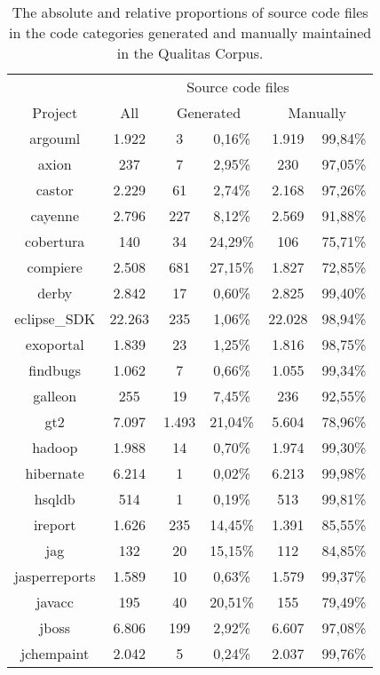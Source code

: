 \setlength{\extrarowheight}{-.17em}
\begin{table}
	\caption[Source code file distributions in the Qualitas Corpus.]{The absolute and relative proportions of source code files in the code categories generated and manually maintained in the Qualitas Corpus.}
	\label{table:countQualitasCorpus}
	\begin{tabularx}{\textwidth}{c|c|c|c|c|c}
		 & \multicolumn{5}{c}{Source code files}  \\
		Project & All & \multicolumn{2}{c|}{Generated} & \multicolumn{2}{c}{Manually}\\
		\hline
		argouml & 1.922 & 3 & 0,16\% & 1.919 & 99,84\% \\
		axion & 237 & 7 & 2,95\% & 230 & 97,05\% \\
		castor & 2.229 & 61 & 2,74\% & 2.168 & 97,26\% \\
		cayenne & 2.796 & 227 & 8,12\% & 2.569 & 91,88\% \\
		cobertura & 140 & 34 & 24,29\% & 106 & 75,71\% \\
		compiere & 2.508 & 681 & 27,15\% & 1.827 & 72,85\% \\
		derby & 2.842 & 17 & 0,60\% & 2.825 & 99,40\% \\
		eclipse\_SDK & 22.263 & 235 & 1,06\% & 22.028 & 98,94\% \\
		exoportal & 1.839 & 23 & 1,25\% & 1.816 & 98,75\% \\
		findbugs & 1.062 & 7 & 0,66\% & 1.055 & 99,34\% \\
		galleon & 255 & 19 & 7,45\% & 236 & 92,55\% \\
		gt2 & 7.097 & 1.493 & 21,04\% & 5.604 & 78,96\% \\
		hadoop & 1.988 & 14 & 0,70\% & 1.974 & 99,30\% \\
		hibernate & 6.214 & 1 & 0,02\% & 6.213 & 99,98\% \\
		hsqldb & 514 & 1 & 0,19\% & 513 & 99,81\% \\
		ireport & 1.626 & 235 & 14,45\% & 1.391 & 85,55\% \\
		jag & 132 & 20 & 15,15\% & 112 & 84,85\% \\
		jasperreports & 1.589 & 10 & 0,63\% & 1.579 & 99,37\% \\
		javacc & 195 & 40 & 20,51\% & 155 & 79,49\% \\
		jboss & 6.806 & 199 & 2,92\% & 6.607 & 97,08\% \\
		jchempaint & 2.042 & 5 & 0,24\% & 2.037 & 99,76\% \\

\end{tabularx}
\end{table}
